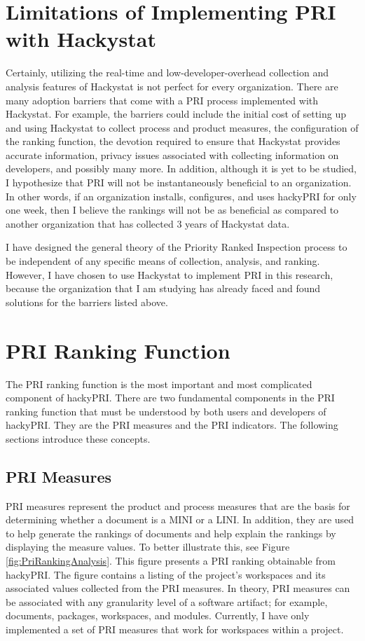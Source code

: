\section{Limitations of Implementing PRI with Hackystat}
\label{section:limitations}
Certainly, utilizing the real-time and low-developer-overhead collection
and analysis features of Hackystat is not perfect for every organization.
There are many adoption barriers that come with a PRI process implemented
with Hackystat. For example, the barriers could include the initial cost of
setting up and using Hackystat to collect process and product measures, the
configuration of the ranking function, the devotion required to ensure that
Hackystat provides accurate information, privacy issues associated with
collecting information on developers, and possibly many more.  In addition,
although it is yet to be studied, I hypothesize that PRI will not be
instantaneously beneficial to an organization. In other words, if an
organization installs, configures, and uses hackyPRI for only one week,
then I believe the rankings will not be as beneficial as compared to
another organization that has collected 3 years of Hackystat data.

I have designed the general theory of the Priority Ranked Inspection
process to be independent of any specific means of collection, analysis,
and ranking.  However, I have chosen to use Hackystat to implement PRI in
this research, because the organization that I am studying has already
faced and found solutions for the barriers listed above. 



\section{PRI Ranking Function}
\label{section:prirankingfunction}
The PRI ranking function is the most important and most complicated
component of hackyPRI. There are two fundamental components in the PRI
ranking function that must be understood by both users and developers of
hackyPRI. They are the PRI measures and the PRI indicators. The following
sections introduce these concepts.

\subsection{PRI Measures}
PRI measures represent the product and process measures that are the basis
for determining whether a document is a MINI or a LINI. In addition, they
are used to help generate the rankings of documents and help explain the
rankings by displaying the measure values. To better illustrate this, see
Figure \ref{fig:PriRankingAnalysis}. This figure presents a PRI ranking
obtainable from hackyPRI. The figure contains a listing of the project's
workspaces and its associated values collected from the PRI measures. In
theory, PRI measures can be associated with any granularity level of a
software artifact; for example, documents, packages, workspaces, and
modules. Currently, I have only implemented a set of PRI measures that work
for workspaces within a project.

